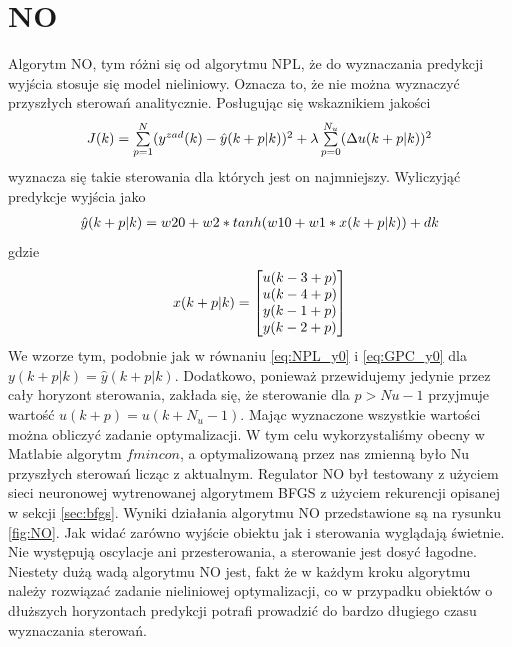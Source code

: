 	\section{NO}
		\label{sec:NO}
		Algorytm NO, tym różni się od algorytmu NPL, że do wyznaczania predykcji wyjścia stosuje się model nieliniowy. Oznacza to, że nie można wyznaczyć przyszłych sterowań analitycznie. Posługując się wskaznikiem jakości
		\begin{equation}
		\begin{tabular}{l}
		$J(k) = \sum\limits_{p=1}^{N}(y^{zad}(k)-\hat{y}(k+p|k))^2+\lambda\sum\limits_{p=0}^{N_u}(\Delta u(k+p|k))^2$
		\end{tabular}
		\label{eq:wsk_jakosc}
		\end{equation}
		wyznacza się takie sterowania dla których jest on najmniejszy.
		Wyliczyjąć predykcje wyjścia jako
		\begin{equation}
		\begin{tabular}{l}
		$\hat{y}(k+p|k)=w20 + w2*tanh(w10+w1*x(k+p|k))+dk$
		\end{tabular}
		\label{eq:NO_wyjscie}
		\end{equation}
		gdzie
		\begin{equation}
		\begin{tabular}{l}
		$x(k+p|k)=\begin{bmatrix}u(k-3+p)\\u(k-4+p)\\y(k-1+p)\\y(k-2+p)\end{bmatrix}$
		\end{tabular}
		\label{eq:NO_wesn}
		\end{equation}
		We wzorze tym, podobnie jak w równaniu \ref{eq:NPL_y0} i \ref{eq:GPC_y0} dla $y(k+p|k)=\hat{y}(k+p|k)$. Dodatkowo, ponieważ przewidujemy jedynie przez cały horyzont sterowania, zakłada się, że sterowanie dla $p>Nu-1$ przyjmuje wartość $u(k+p)=u(k+N_u-1)$. Mając wyznaczone wszystkie wartości można obliczyć zadanie optymalizacji. W tym celu wykorzystaliśmy obecny w Matlabie algorytm $fmincon$, a optymalizowaną przez nas zmienną było Nu przyszłych sterowań licząc z aktualnym.
		Regulator NO był testowany z użyciem sieci neuronowej wytrenowanej algorytmem BFGS z użyciem rekurencji opisanej w sekcji \ref{sec:bfgs}. Wyniki działania algorytmu NO przedstawione są na rysunku \ref{fig:NO}. Jak widać zarówno wyjście obiektu jak i sterowania wyglądają świetnie. Nie występują oscylacje ani przesterowania, a sterowanie jest dosyć łagodne. Niestety dużą wadą algorytmu NO jest, fakt że w każdym kroku algorytmu należy rozwiązać zadanie nieliniowej optymalizacji, co w przypadku obiektów o dłuższych horyzontach predykcji potrafi prowadzić do bardzo długiego czasu wyznaczania sterowań.
